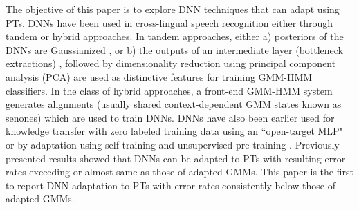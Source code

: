 \documentclass[a4paper]{article}
\begin{document}
The objective of this paper is to explore DNN techniques that can adapt using PTs.
DNNs have been used in cross-lingual speech recognition either through tandem or hybrid approaches. In tandem approaches, either a) posteriors of the DNNs are Gaussianized \cite{Stolcke-DNNPostFeatures, Thomas-DNNPostFeatures}, or b) the outputs of an intermediate layer (bottleneck extractions) \cite{Grezl-BNFFirstPaper, Thomas-BNFXlingual}, followed by dimensionality reduction using principal component analysis (PCA) are used as distinctive features for training GMM-HMM classifiers. In the class of hybrid approaches, a front-end GMM-HMM system generates alignments (usually shared context-dependent GMM states known as senones) which are used to train DNNs. %
DNNs have also been earlier used for knowledge transfer with zero labeled training data using an ``open-target MLP" \cite{Vu-MLPInitSchemes} or by adaptation using self-training and unsupervised pre-training \cite{Knill-SelfTrainingAndUnsupAdapt}. Previously presented results \cite{Hasegawa-WS15presentation} showed that DNNs can be adapted to PTs with resulting error rates exceeding or almost same as those of adapted GMMs.  This paper is the first to report DNN adaptation to PTs with error rates consistently below those of adapted GMMs. 
\end{document}
